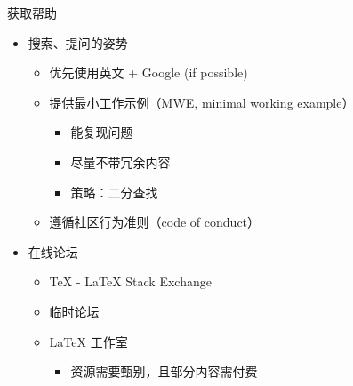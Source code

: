 \begin{frame}{获取帮助}
\begin{itemize}
  \item<+-> 搜索、提问的姿势

    \begin{itemize}
      \item 优先使用英文 + Google (if possible)
      \item 提供最小工作示例（MWE, minimal working example）
        \begin{itemize}
          \item 能复现问题
          \item 尽量不带冗余内容
          \item 策略：二分查找
        \end{itemize}
      \item 遵循社区行为准则（code of conduct）
    \end{itemize}

  \item<+-> 在线论坛

    \begin{itemize}
      \item \TeX{} - \LaTeX{} Stack Exchange 
      \item \CTeX{} 临时论坛 
      \item \LaTeX{} 工作室 
        \begin{itemize}
          \item 资源需要甄别，且部分内容需付费
        \end{itemize}
    \end{itemize}
\end{itemize}
\end{frame}

